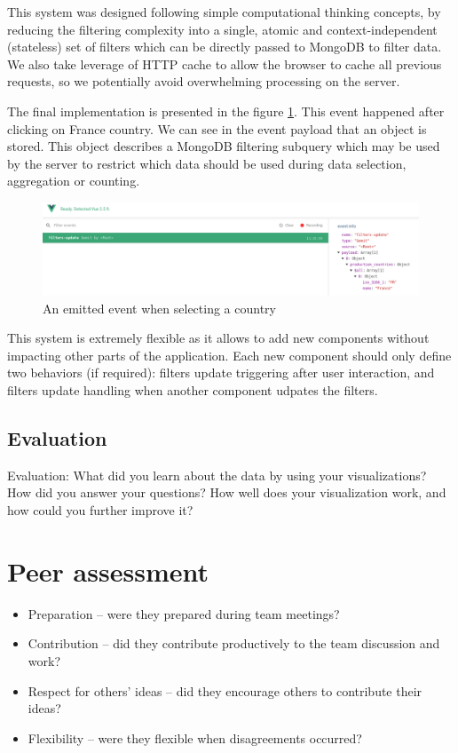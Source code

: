 \documentclass[a4paper,10pt]{article}
\begin{document}
This system was designed following simple computational thinking concepts, by reducing
the filtering complexity into a single, atomic and context-independent (stateless) set of filters which can be directly
passed to MongoDB to filter data. We also take leverage of HTTP cache to allow
the browser to cache all previous requests, so we potentially avoid overwhelming processing
on the server.

The final implementation is presented in the figure \ref{fig:screen-filtering}.
This event happened after clicking on France country. We can see in the event
payload that an object is stored. This object describes a MongoDB filtering subquery
which may be used by the server to restrict which data should be used during data
selection, aggregation or counting.

\begin{figure}[ht]
   \centering
   \includegraphics[width=1\linewidth]{images/screens/filtering-example.png}
  \caption{An emitted event when selecting a country} \label{fig:screen-filtering}
\end{figure}

This system is extremely flexible as it allows to add new components without impacting
other parts of the application. Each new component should only define two behaviors (if required):
filters update triggering after user interaction, and filters update handling when
another component udpates the filters.

\subsection{Evaluation}

Evaluation: What did you learn about the data by using your visualizations? How did you answer your questions? How well does your visualization work, and how could you further improve it?

\section{Peer assessment}

\begin{itemize}
  \item Preparation – were they prepared during team meetings?
  \item Contribution – did they contribute productively to the team discussion and work?
  \item Respect for others’ ideas – did they encourage others to contribute their ideas?
  \item Flexibility – were they flexible when disagreements occurred?
\end{itemize}

\setlength{\parskip}{0.1\baselineskip}

\newpage

\listoffigures
\end{document}
